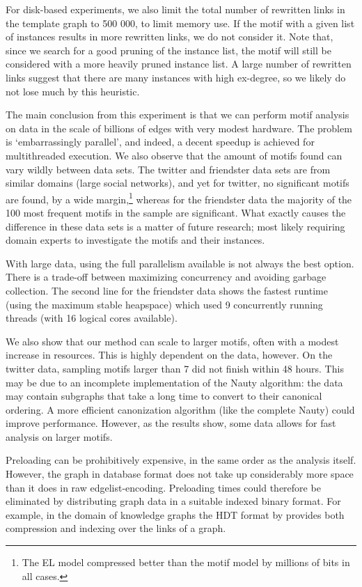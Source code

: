 \documentclass[twoside,11pt]{article}
\begin{document}
For disk-based experiments, we also limit the total number of rewritten links in the template graph to 500 000, to limit memory use. If the motif with a given list of instances results in more rewritten links, we do not consider it. Note that, since we search for a good pruning of the instance list, the motif will still be considered with a more heavily pruned instance list. A large number of rewritten links suggest that there are many instances with high ex-degree, so we likely do not lose much by this heuristic. 

The main conclusion from this experiment is that we can perform motif analysis on data in the scale of billions of edges with very modest hardware. The problem is `embarrassingly parallel', and indeed, a decent speedup is achieved for multithreaded execution. We also observe that the amount of motifs found can vary wildly between data sets. The twitter and friendster data sets are from similar domains (large social networks), and yet for twitter, no significant motifs are found, by a wide margin,\footnote{The EL model compressed better than the motif model by millions of bits in all cases.} whereas for the friendster data the majority of the 100 most frequent motifs in the sample are significant. What exactly causes the difference in these data sets is a matter of future research; most likely requiring domain experts to investigate the motifs and their instances. 

With large data, using the full parallelism available is not always the best option. There is a trade-off between maximizing concurrency and avoiding garbage collection. The second line for the friendster data shows the fastest runtime (using the maximum stable heapspace) which used 9 concurrently running threads (with 16 logical cores available).

We also show that our method can scale to larger motifs, often with a modest increase in resources. This is highly dependent on the data, however. On the twitter data, sampling motifs larger than 7 did not finish within 48 hours. This may be due to an incomplete implementation of the Nauty algorithm: the data may contain subgraphs that take a long time to convert to their canonical ordering. A more efficient canonization algorithm (like the complete Nauty) could improve performance. However, as the results show, some data allows for fast analysis on larger motifs.

Preloading can be prohibitively expensive, in the same order as the analysis itself. However, the graph in database format does not take up considerably more space than it does in raw edgelist-encoding. Preloading times could therefore be eliminated by distributing graph data in a suitable indexed binary format. For example, in the domain of knowledge graphs the HDT format by \cite{fernandez2013binary} provides both compression and indexing over the links of a graph.
\end{document}
